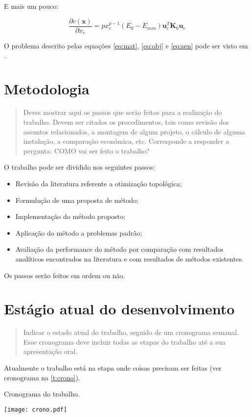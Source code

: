 E mais um pouco:

\begin{equation}\label{eq:sen}
\frac{\partial c(\mathbf{x})}{\partial x_e} = p x_e^{p-1}(E_0-E_{min})
\mathbf{u}^T_e \mathbf{K}_0 \mathbf{u}_e
\end{equation}

O problema descrito pelas equações \ref{eq:mat}, \ref{eq:obj} e \autoref{eq:sen}
pode ser visto em .


\section{Metodologia}

\begin{quote}
Deves mostrar aqui os passos que serão feitos para a realização do trabalho.
Devem ser citados os procedimentos, tais como revisão dos assuntos relacionados,
a montagem de algum projeto, o cálculo de alguma instalação, a comparação econômica, etc.
Corresponde a responder a pergunta: COMO vai ser feito o trabalho?
\end{quote}

O trabalho pode ser dividido nos seguintes passos:

\begin{itemize}
\item Revisão da literatura referente a otimização topológica;
\item Formulação de uma proposta de método;
\item Implementação do método proposto;
\item Aplicação do método a problemas padrão;
\item Avaliação da performance do método por comparação com resultados
	analíticos encontrados na literatura e com resultados de métodos existentes.
\end{itemize}

Os passos serão feitos em ordem ou não.

\section{Estágio atual do desenvolvimento}\label{cap_crono}

\begin{quote}
Indicar o estado atual do trabalho, seguido de um cronograma semanal. Esse cronograma deve
incluir todas as etapas do trabalho até a sua apresentação oral.
\end{quote}

Atualmente o trabalho está na etapa onde coisas precisam ser feitas (ver cronograma na \autoref{t:crono}).

\begin{table}[hb]
	\caption{\label{t:crono}Cronograma do trabalho.}
	\center
	\texttt{[image: crono.pdf]}
\end{table}
